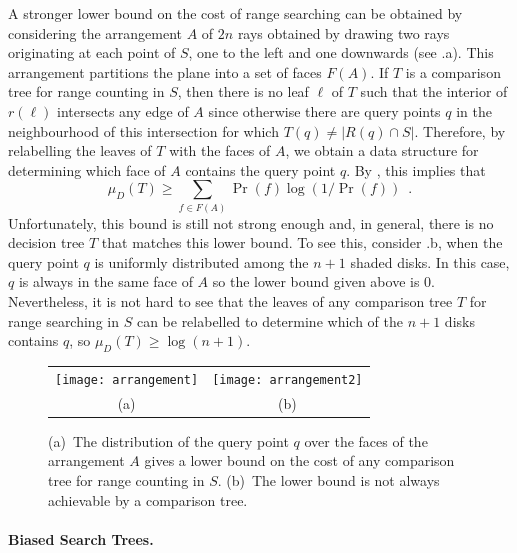 \documentclass{patmorin}
\begin{document}
A stronger lower bound on the cost of range searching can be obtained
by considering the arrangement $A$ of $2n$ rays obtained by drawing
two rays originating at each point of $S$, one to the left and one
downwards (see .a).  This arrangement partitions
the plane into a set of faces $F(A)$.  If $T$ is a comparison tree for
range counting in $S$, then there is no leaf $\ell$ of $T$ such that
the interior of $r(\ell)$ intersects any edge of $A$ since otherwise
there are query points $q$ in the neighbourhood of this intersection
for which $T(q)\neq |R(q)\cap S|$.  Therefore, by relabelling the leaves
of $T$ with the faces of $A$, we obtain a data structure for
determining which face of $A$ contains the query point $q$.
By , this implies that
\[
   \mu_D(T) \ge \sum_{f\in F(A)} \Pr(f)\log(1/\Pr(f)) \enspace .
\]
Unfortunately, this bound is still not strong enough and, in general,
there is no decision tree $T$ that matches this lower bound.  To see
this, consider .b, when the query point $q$ is
uniformly distributed among the $n+1$ shaded disks.  In this case,
$q$ is always in the same face of $A$ so the lower bound given above
is 0.  Nevertheless, it is not hard to see that the leaves of
any comparison tree $T$ for range searching in $S$ can be relabelled to
determine which of the $n+1$ disks contains $q$, so $\mu_D(T) \ge
\log(n+1)$.

\begin{figure}
  \begin{center}
    \begin{tabular}{cc}
      \texttt{[image: arrangement]} &
      \texttt{[image: arrangement2]} \\
        (a) & (b)
    \end{tabular}
  \end{center}
  \caption{(a)~The distribution of the query point $q$ over the faces
     of the arrangement $A$ gives a lower bound on the cost of any
     comparison tree for range counting in $S$. (b)~The lower bound is
     not always achievable by a comparison tree.}
\end{figure}

\paragraph{Biased Search Trees.}
\end{document}
